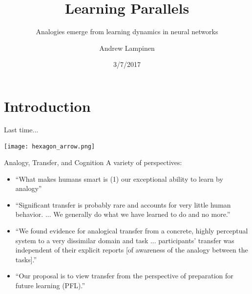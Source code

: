 \documentclass{beamer}
\begin{document}
\title{Learning Parallels}
\subtitle{Analogies emerge from learning dynamics in neural networks}
\author{Andrew Lampinen}
\date{3/7/2017}
\frame{\titlepage}


\section{Introduction}
\begin{frame}{Last time...}
\begin{center}
\texttt{[image: hexagon\_arrow.png]}
\end{center}
\end{frame}

\begin{frame}{Analogy, Transfer, and Cognition}
A variety of perspectives:
\begin{itemize}
    \item<1-> ``What makes humans smart is (1) our exceptional ability to learn by analogy'' \cite{Gentner2003} 
    \item<2-> ``Significant transfer is probably rare and accounts for very little human behavior. ... We generally do what we have learned to do and no more.'' \cite{Detterman1993}
    \item<3-> ``We found evidence for analogical transfer from a concrete, highly perceptual system to a very dissimilar domain and task ... participants' transfer was independent of their explicit reports [of awareness of the analogy between the tasks].'' \cite{Day2011}
    \item<4-> ``Our proposal is to view transfer from the perspective of preparation for future learning (PFL).'' \cite{Bransford1999} 
\end{itemize}
\end{frame}
\end{document}

